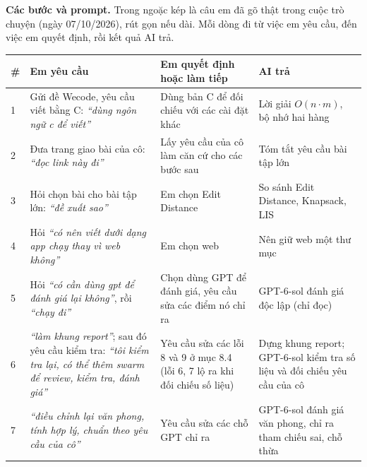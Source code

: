 \documentclass[12pt,a4paper]{article}
\begin{document}
\textbf{Các bước và prompt.} Trong ngoặc kép là câu em đã gõ thật trong cuộc trò chuyện (ngày 07/10/2026), rút gọn nếu dài. Mỗi dòng đi từ việc em yêu cầu, đến việc em quyết định, rồi kết quả AI trả.
\begin{center}
\small
\begin{tabular}{@{}p{0.4cm}p{5.0cm}p{5.4cm}p{3.4cm}@{}}
\toprule
\# & Em yêu cầu & Em quyết định hoặc làm tiếp & AI trả\\
\midrule
1 & Gửi đề Wecode, yêu cầu viết bằng C: \emph{``dùng ngôn ngữ c để viết''} & Dùng bản C để đối chiếu với các cài đặt khác & Lời giải $O(n\cdot m)$, bộ nhớ hai hàng\\
2 & Đưa trang giao bài của cô: \emph{``đọc link này đi''} & Lấy yêu cầu của cô làm căn cứ cho các bước sau & Tóm tắt yêu cầu bài tập lớn\\
3 & Hỏi chọn bài cho bài tập lớn: \emph{``đề xuất sao''} & Em chọn Edit Distance & So sánh Edit Distance, Knapsack, LIS\\
4 & Hỏi \emph{``có nên viết dưới dạng app chạy thay vì web không''} & Em chọn web & Nên giữ web một thư mục\\
5 & Hỏi \emph{``có cần dùng gpt để đánh giá lại không''}, rồi \emph{``chạy đi''} & Chọn dùng GPT để đánh giá, yêu cầu sửa các điểm nó chỉ ra & GPT-6-sol đánh giá độc lập (chỉ đọc)\\
6 & \emph{``làm khung report''}; sau đó yêu cầu kiểm tra: \emph{``tôi kiểm tra lại, có thể thêm swarm để review, kiểm tra, đánh giá''} & Yêu cầu sửa các lỗi 8 và 9 ở mục 8.4 (lỗi 6, 7 lộ ra khi đối chiếu số liệu) & Dựng khung report; GPT-6-sol kiểm tra số liệu và đối chiếu yêu cầu của cô\\
7 & \emph{``điều chỉnh lại văn phong, tính hợp lý, chuẩn theo yêu cầu của cô''} & Yêu cầu sửa các chỗ GPT chỉ ra & GPT-6-sol đánh giá văn phong, chỉ ra tham chiếu sai, chỗ thừa\\
\bottomrule
\end{tabular}
\end{center}
\end{document}
